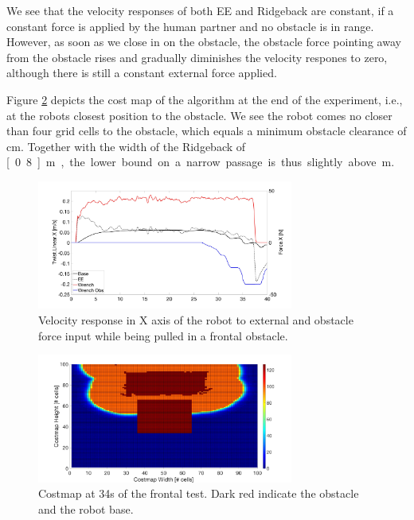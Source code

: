 We see that the velocity responses of both EE and Ridgeback are constant, if a constant force is applied by the human partner and no obstacle is in range. However, as soon as we close in on the obstacle, the obstacle force pointing away from the obstacle rises and gradually diminishes the velocity respones to zero, although there is still a constant external force applied.

Figure \ref{pics:test2_costmap} depicts the cost map of the algorithm at the end of the experiment, i.e., at the robots closest position to the obstacle. We see the robot comes no closer than four grid cells to the obstacle, which equals a minimum obstacle clearance of \unit[12]{cm}. Together with the width of the Ridgeback of \unit[0.8]{m}, the lower bound on a narrow passage is thus slightly above\unit[1]{m}.

\begin{figure}
   \centering
   \includegraphics[width=0.75\textwidth]{images/test2.jpg}
   \caption{Velocity response in X axis of the robot to external and obstacle force input while being pulled in a frontal obstacle.}
   \label{pics:test2}
\end{figure}

\begin{figure}
   \centering
   \includegraphics[width=0.75\textwidth]{images/test2_costmap.jpg}
   \caption{Costmap at \unit{34}{s} of the frontal test. Dark red indicate the obstacle and the robot base.}
   \label{pics:test2_costmap}
\end{figure}

